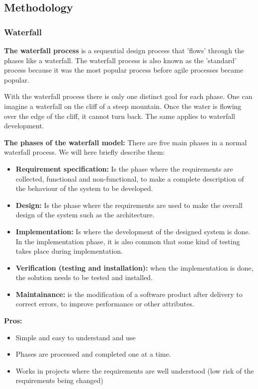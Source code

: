 \subsection{Methodology}

\subsubsection{Waterfall}

{\bf The waterfall process } is a sequential design process that 'flows' through the phases like a waterfall.
The waterfall process is also known as the 'standard' process because it was the most popular process before
agile processes became popular. 

With the waterfall process there is only one distinct goal for each phase. One can imagine a waterfall on the cliff of a steep mountain. Once the water is flowing over the edge of the cliff, it cannot turn back. The same applies to waterfall development. \cite{wikiWaterfall, techtargetWaterfall}

{\bf The phases of the waterfall model:} There are five main phases in a normal waterfall process. We will here briefly
describe them:
\begin{itemize}
	\item {\bf Requirement specification:} Is the phase where the requirements are collected, functional and non-functional, to make a complete description of the behaviour of the system to be developed.
	\item {\bf Design: } Is the phase where the requirements are used to make the overall design of the system such as the
	architecture.
	\item {\bf Implementation: } Is where the development of the designed system is done. In the implementation phase, 
	it is also common that some kind of testing takes place during implementation.
	\item {\bf Verification (testing and installation): } when the implementation is done, the solution needs to be tested and installed.
	\item {\bf Maintainance: } is the modification of a software product after delivery to correct errors, to improve performance or other attributes.
\end{itemize}

{\bf Pros: }
\begin{itemize}
	\item Simple and easy to understand and use
	\item Phases are processed and completed one at a time.
	\item Works in projects where the requirements are well understood (low risk of the requirements being changed)
\end{itemize}

